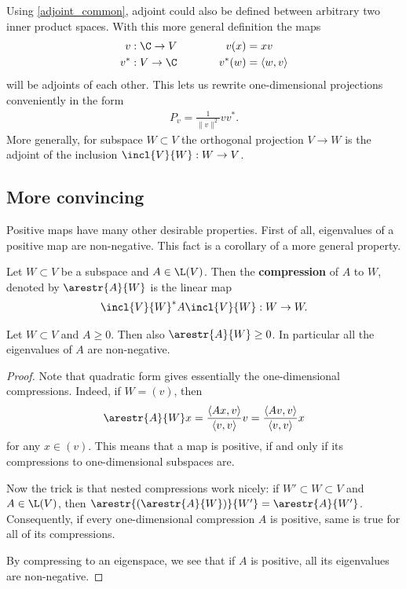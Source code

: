 Using \ref{adjoint_common}, adjoint could also be defined between arbitrary two inner product spaces. With this more general definition the maps
\begin{align*}
	v : \C \to V & \hspace{1cm} & v(x) &= x v \\
	v^{*} : V \to \C & \hspace{1cm} & v^{*}(w) &= \langle w, v \rangle
\end{align*}
will be adjoints of each other. This lets us rewrite one-dimensional projections conveniently in the form
\begin{align*}
	P_{v} = \frac{1}{\|v\|^2} v v^{*}.
\end{align*}
More generally, for subspace $W \subset V$ the orthogonal projection $V \to W$ is the adjoint of the inclusion $\incl{V}{W} : W \to V$.

\subsection{More convincing}

Positive maps have many other desirable properties. First of all, eigenvalues of a positive map are non-negative. This fact is a corollary of a more general property.

\begin{maar}
	Let $W \subset V$ be a subspace and $A \in \L(V)$. Then the \textbf{compression} of $A$ to $W$, denoted by $\arestr{A}{W}$ is the linear map
	\begin{align*}
		\incl{V}{W}^{*} A \incl{V}{W} : W \to W.
	\end{align*}
\end{maar}

\begin{lem}
	Let $W \subset V$ and $A \geq 0$. Then also $\arestr{A}{W} \geq 0$. In particular all the eigenvalues of $A$ are non-negative.
\end{lem}
\begin{proof}
	Note that quadratic form gives essentially the one-dimensional compressions. Indeed, if $W = (v)$, then
	\begin{align*}
		\arestr{A}{W} x = \frac{\langle A x, v \rangle}{\langle v, v \rangle} v = \frac{\langle A v, v \rangle}{\langle v, v \rangle} x
	\end{align*}
	for any $x \in (v)$. This means that a map is positive, if and only if its compressions to one-dimensional subspaces are.

	Now the trick is that nested compressions work nicely: if $W' \subset W \subset V$ and $A \in \L(V)$, then $\arestr{(\arestr{A}{W})}{W'} = \arestr{A}{W'}$. Consequently, if every one-dimensional compression $A$ is positive, same is true for all of its compressions.

	By compressing to an eigenspace, we see that if $A$ is positive, all its eigenvalues are non-negative.
\end{proof}

